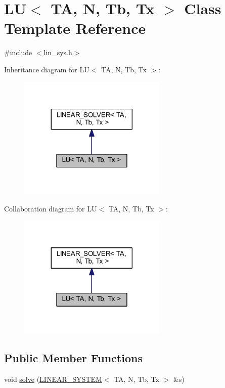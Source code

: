 \hypertarget{class_l_u}{}\section{LU$<$ TA, N, Tb, Tx $>$ Class Template Reference}
\label{class_l_u}


{\ttfamily \#include $<$lin\+\_\+sys.\+h$>$}



Inheritance diagram for LU$<$ TA, N, Tb, Tx $>$\+:\nopagebreak
\begin{figure}[H]
\begin{center}
\leavevmode
\includegraphics[width=200pt]{class_l_u__inherit__graph}
\end{center}
\end{figure}


Collaboration diagram for LU$<$ TA, N, Tb, Tx $>$\+:\nopagebreak
\begin{figure}[H]
\begin{center}
\leavevmode
\includegraphics[width=200pt]{class_l_u__coll__graph}
\end{center}
\end{figure}
\subsection*{Public Member Functions}
\begin{DoxyCompactItemize}
\item 
void \mbox{\hyperlink{class_l_u_a624d7ff38645debae206313534516f49}{solve}} (\mbox{\hyperlink{class_l_i_n_e_a_r___s_y_s_t_e_m}{L\+I\+N\+E\+A\+R\+\_\+\+S\+Y\+S\+T\+EM}}$<$ TA, N, Tb, Tx $>$ \&s)
\end{DoxyCompactItemize}


